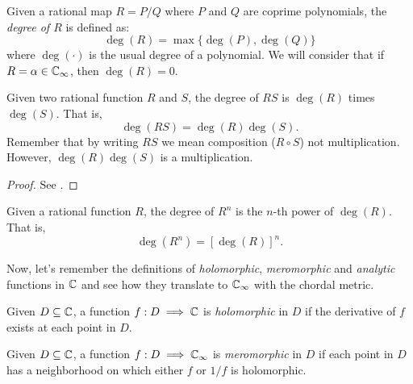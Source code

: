 \begin{definition}
    Given a rational map $R = P/Q$ where $P$ and $Q$ are coprime polynomials,
    the \emph{degree of $R$} is defined as:
    \begin{equation*}
        \deg(R) = \max \{ \deg(P), \deg(Q) \}
    \end{equation*}
    where $\deg(\cdot)$ is the usual degree of a polynomial. We will consider
    that if $R = \alpha \in \mathbb{C}_\infty$, then $\deg(R) = 0$.
\end{definition}

\begin{proposition}[{$\deg(RS) = \deg(R)\deg(S)$}]
    Given two rational function $R$ and $S$, the degree of $RS$ is $\deg(R)$
    times $\deg(S)$. That is,
    \begin{equation*}
        \deg(RS) = \deg(R)\deg(S).
    \end{equation*}
    Remember that by writing $RS$ we mean composition ($R \circ S$) not
    multiplication. However, $\deg(R)\deg(S)$ is a multiplication.
\end{proposition}
\begin{proof}
    See \cite[32]{Beardon1991}.
\end{proof}

\begin{corollary}[{$\deg(R^n) = [\deg(R)]^n$}] Given a rational function $R$,
    the degree of $R^n$ is the $n$-th power of $\deg(R)$. That is,
    \begin{equation*}
        \deg(R^n) = [\deg(R)]^n.
    \end{equation*}
\end{corollary}

Now, let's remember the definitions of \emph{holomorphic}, \emph{meromorphic}
and \emph{analytic} functions in $\mathbb{C}$ and see how they translate to $\mathbb{C}_\infty$ with
the chordal metric.

\begin{definition}[Holomorphic]
    Given $D \subseteq \mathbb{C}$, a function $f : D \implies \mathbb{C}$ is
    \emph{holomorphic} in $D$ if the derivative of $f$ exists at each point in
    $D$.
\end{definition}

\begin{definition}[Meromorphic]
    Given $D \subseteq \mathbb{C}$, a function $f : D \implies \mathbb{C}_\infty$ is
    \emph{meromorphic} in $D$ if each point in $D$ has a neighborhood on which
    either $f$ or $1/f$ is holomorphic.
\end{definition}

